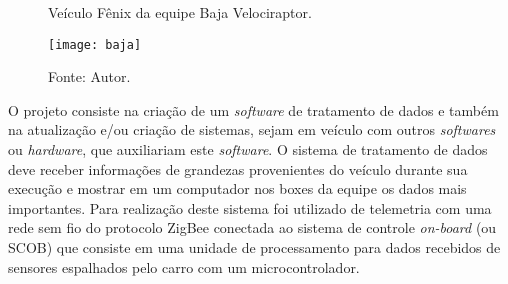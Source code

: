 
\begin{figure}[!htb]
	\centering
		\caption{Veículo Fênix da equipe Baja Velociraptor.}
		\texttt{[image: baja]} 
		\caption*{Fonte: Autor.}
		\label{fig:Baja}
\end{figure} 


O projeto consiste na criação de um \textit{software} de tratamento de dados e também na atualização e/ou criação de sistemas, sejam em veículo com outros \textit{softwares} ou \textit{hardware}, que auxiliariam este \textit{software}. O sistema de tratamento de dados deve receber informações de grandezas provenientes do veículo durante sua execução e mostrar em um computador nos boxes da equipe os dados mais importantes. Para realização deste sistema foi utilizado de telemetria com uma rede sem fio do protocolo ZigBee conectada ao sistema de controle \textit{on-board} (ou SCOB) que consiste em uma unidade de processamento para dados recebidos de sensores espalhados pelo carro com um microcontrolador.   

